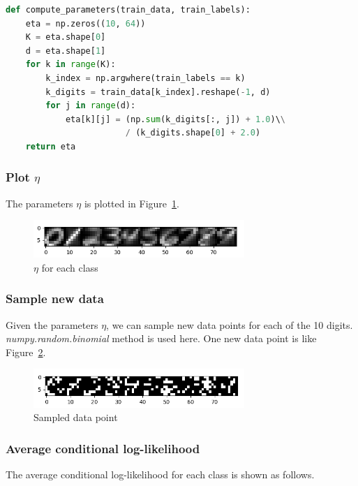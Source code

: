 \documentclass[a4paper]{article}
\begin{document}
\begin{lstlisting}[language = Python]
def compute_parameters(train_data, train_labels):
    eta = np.zeros((10, 64))
    K = eta.shape[0]
    d = eta.shape[1]
    for k in range(K):
        k_index = np.argwhere(train_labels == k)
        k_digits = train_data[k_index].reshape(-1, d)
        for j in range(d):
            eta[k][j] = (np.sum(k_digits[:, j]) + 1.0)\\
                        / (k_digits.shape[0] + 2.0)
    return eta
\end{lstlisting}

\subsubsection{Plot $\eta$}
The parameters $\eta$ is plotted in Figure~\ref{fig: Plot_eta}.

\begin{figure}[htbp]
\centering
\includegraphics[width = 8cm]{Plot_eta}
\caption{$\eta$ for each class}
\label{fig: Plot_eta}
\end{figure}

\subsubsection{Sample new data}

Given the parameters $\eta$, we can sample new data points for each of the 10 digits. \textit{numpy.random.binomial} method is used here. One new data point is like Figure~\ref{fig: New_data}.

\begin{figure}[htbp]
\centering
\includegraphics[width = 8cm]{New_data}
\caption{Sampled data point}
\label{fig: New_data}
\end{figure}

\subsubsection{Average conditional log-likelihood}

The average conditional log-likelihood for each class is shown as follows.
\end{document}
